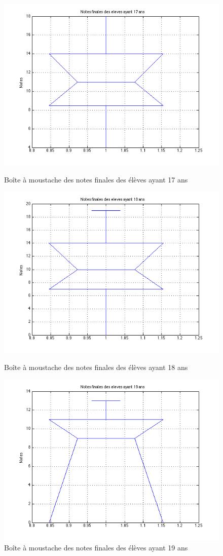 \documentclass[11pt]{article}
\begin{document}
\begin{figure}[h]
\centering
\includegraphics[scale=0.5]{Images/fig42.png}
\caption{Boîte à moustache des notes finales des élèves ayant 17 ans}
\includegraphics[scale=0.5]{Images/fig43.png}
\caption{Boîte à moustache des notes finales des élèves ayant 18 ans}
\includegraphics[scale=0.5]{Images/fig44.png}
\caption{Boîte à moustache des notes finales des élèves ayant 19 ans}
\end{figure}
\end{document}
